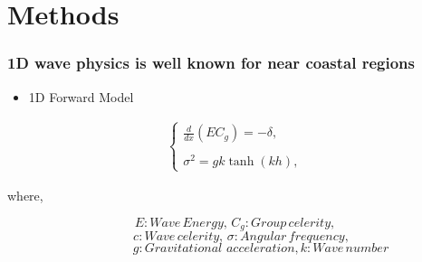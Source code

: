 \documentclass[7pt]{beamer}
\begin{document}
\section{Methods}


\begin{frame}
 \frametitle{1D wave physics is well known for near coastal regions}
\centering
\begin{itemize}
\item 1D Forward Model
\end{itemize}

\begin{eqnarray*}
\label{fp1}
\left \{
\begin{array}{lll}
\frac{d}{dx}\left(EC_g\right)=-\delta,\\
\\
\sigma^2=gk\tanh(kh),
\label{ode}
\end{array}
\right.
\end{eqnarray*}
\begin{flushleft}
where,
\end{flushleft}
$${E: Wave \,Energy,\, C_{g}: Group \,celerity,}$$
$${\quad c: Wave \,celerity,\, \sigma: Angular \,frequency,}$$
$${\quad\quad\quad\quad g: Gravitational\,\, acceleration,k: Wave \,number}$$
\end{frame}
\end{document}
